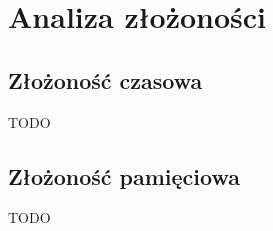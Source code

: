 \section{Analiza złożoności}

    \subsection{Złożoność czasowa}
        TODO

    
    \subsection{Złożoność pamięciowa}
        TODO